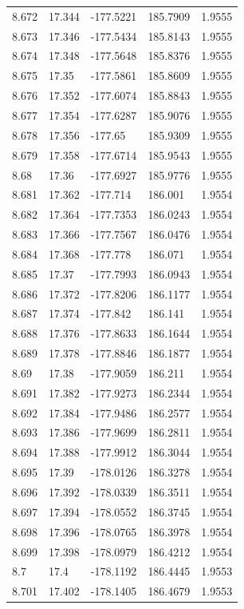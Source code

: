 \begin{tabular}{lllll}
8.672 & 17.344 & -177.5221 & 185.7909 & 1.9555 \\
8.673 & 17.346 & -177.5434 & 185.8143 & 1.9555 \\
8.674 & 17.348 & -177.5648 & 185.8376 & 1.9555 \\
8.675 & 17.35 & -177.5861 & 185.8609 & 1.9555 \\
8.676 & 17.352 & -177.6074 & 185.8843 & 1.9555 \\
8.677 & 17.354 & -177.6287 & 185.9076 & 1.9555 \\
8.678 & 17.356 & -177.65 & 185.9309 & 1.9555 \\
8.679 & 17.358 & -177.6714 & 185.9543 & 1.9555 \\
8.68 & 17.36 & -177.6927 & 185.9776 & 1.9555 \\
8.681 & 17.362 & -177.714 & 186.001 & 1.9554 \\
8.682 & 17.364 & -177.7353 & 186.0243 & 1.9554 \\
8.683 & 17.366 & -177.7567 & 186.0476 & 1.9554 \\
8.684 & 17.368 & -177.778 & 186.071 & 1.9554 \\
8.685 & 17.37 & -177.7993 & 186.0943 & 1.9554 \\
8.686 & 17.372 & -177.8206 & 186.1177 & 1.9554 \\
8.687 & 17.374 & -177.842 & 186.141 & 1.9554 \\
8.688 & 17.376 & -177.8633 & 186.1644 & 1.9554 \\
8.689 & 17.378 & -177.8846 & 186.1877 & 1.9554 \\
8.69 & 17.38 & -177.9059 & 186.211 & 1.9554 \\
8.691 & 17.382 & -177.9273 & 186.2344 & 1.9554 \\
8.692 & 17.384 & -177.9486 & 186.2577 & 1.9554 \\
8.693 & 17.386 & -177.9699 & 186.2811 & 1.9554 \\
8.694 & 17.388 & -177.9912 & 186.3044 & 1.9554 \\
8.695 & 17.39 & -178.0126 & 186.3278 & 1.9554 \\
8.696 & 17.392 & -178.0339 & 186.3511 & 1.9554 \\
8.697 & 17.394 & -178.0552 & 186.3745 & 1.9554 \\
8.698 & 17.396 & -178.0765 & 186.3978 & 1.9554 \\
8.699 & 17.398 & -178.0979 & 186.4212 & 1.9554 \\
8.7 & 17.4 & -178.1192 & 186.4445 & 1.9553 \\
8.701 & 17.402 & -178.1405 & 186.4679 & 1.9553 \\

\end{tabular}
